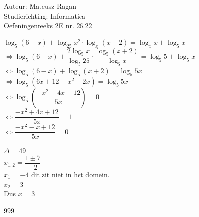 \documentclass[a4paper]{article}
\begin{document}
\noindent \large Auteur: Mateusz Ragan \\
\noindent \large Studierichting: Informatica\\
\noindent \large Oefeningenreeks 2E nr. 26.22\\

\medskip

\normalsize

$\log_{5}(6-x)+\log_{25}x^2\cdot\log_{x}(x+2) = \log_{x}x + \log_{5}x$\\

$\Leftrightarrow \log_{5}(6-x) + \dfrac{2 \log_{5}x}{\log_{5}25} \cdot \dfrac{\log_{5}(x+2)}{\log_{5}x} = \log_{5}5 + \log_{5}x$\\

$\Leftrightarrow \log_{5}(6-x) + \log_{5}(x+2) = \log_{5}5x$\\

$\Leftrightarrow \log_{5}(6x+12-x^2-2x) = \log_{5}5x$\\

$\Leftrightarrow \log_{5}\left(\dfrac{-x^2+4x+12}{5x}\right) = 0$\\

$\Leftrightarrow \dfrac{-x^2+4x+12}{5x} = 1$\\

$\Leftrightarrow \dfrac{-x^2-x+12}{5x} = 0$

$\Delta = 49$\\

$x_{1,2} = \dfrac{1\pm7}{-2}$\\

$x_{1} = -4$ dit zit niet in het domein.\\

$x_{2} = 3$\\

Dus $x = 3$




\begin{thebibliography}{999}
\end{thebibliography}
\end{document}
